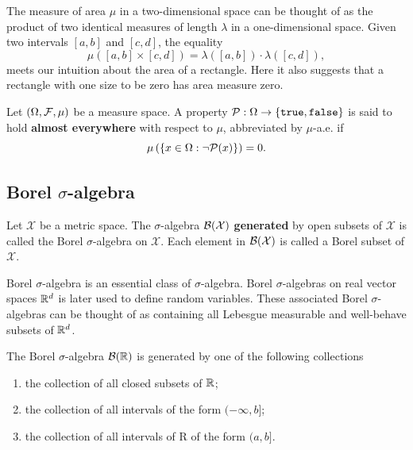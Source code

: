 \begin{example}
 The measure of area $\mu$ in a two-dimensional space can be thought of as the product of two identical measures of length $\lambda$ in a one-dimensional space. Given two intervals $[a,b]$ and $[c,d]$, the equality
 $$\mu([a,b]\times [c,d])=\lambda([a,b])\cdot\lambda([c,d]),$$
 meets our intuition about the area of a rectangle. Here it also suggests that a rectangle with one size to be zero has area measure zero.
\end{example}

\begin{definition}
 \label{definition:property-almost-everywhere}
 Let $(\Omega, \F, \mu)$ be a measure space. A property $\P:\Omega\to\{\texttt{true},\texttt{false}\}$ is said to hold \textbf{almost everywhere} with respect to $\mu$, abbreviated by $\mu$-a.e. if
 $$\mu\left(\left\{x\in\Omega : \neg \P(x)\right\}\right) = 0.$$
\end{definition}

\subsection{Borel \texorpdfstring{$\sigma$}{σ}-algebra}

\begin{definition}
 Let $\mathcal{X}$ be a metric space. The $\sigma$-algebra $\B(\mathcal{X})$ \textbf{generated} by open subsets of $\mathcal{X}$ is called the Borel $\sigma$-algebra on $\mathcal{X}$. Each element in $\B(\mathcal{X})$ is called a Borel subset of $\mathcal{X}$.
\end{definition}

Borel $\sigma$-algebra is an essential class of $\sigma$-algebra. Borel $\sigma$-algebras on real vector spaces $\RR^d$ is later used to define random variables. These associated Borel $\sigma$-algebras can be thought of as containing all Lebesgue measurable and well-behave subsets of $\RR^d$.

\begin{proposition}
 \label{proposition:equivalent-borel-core}
 The Borel $\sigma$-algebra $\B(\RR)$ is generated by one of the following collections
 \begin{enumerate}[label=(\alph*)]
  \item the collection of all closed subsets of $\RR$;
  \item the collection of all intervals of the form $(-\infty,b]$;
  \item the collection of all intervals of R of the form $(a,b]$.
 \end{enumerate}
\end{proposition}

